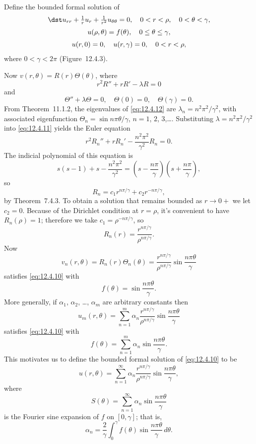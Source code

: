 \setcounter{example}{2}
\setcounter{equation}{9}
\begin{example}
  \label{example:12.4.3} \rm Define the bounded formal solution of
  \begin{equation}
    \label{eq:12.4.10}
    \begin{array}{c}
      \dst u_{rr}+\frac{1}{r}u_{r}+\frac{1}{r^{2}}u_{\theta\theta}=0,\quad 0<r<\rho,\quad0<\theta<\gamma, \\[2\jot]
      u(\rho,\theta)=f(\theta),\quad0\le\theta\le\gamma,                                                  \\[2\jot]
      u(r,0)=0,\quad u(r,\gamma)=0,\quad0<r<\rho,
    \end{array}
  \end{equation}
  where $0<\gamma<2\pi$ (Figure~12.4.3).
\end{example}
\setcounter{equation}{10}
\begin{examplesolution}
\solution Now $v(r,\theta)=R(r)\Theta(\theta)$, where
\begin{equation}
  \label{eq:12.4.11}r^{2}R''+rR'-\lambda R=0
\end{equation}
and
\begin{equation}
  \label{eq:12.4.12}\Theta''+\lambda\Theta=0,\quad\Theta(0)=0,\quad\Theta(\gamma)=0.
\end{equation}
From Theorem~11.1.2, the eigenvalues of \eqref{eq:12.4.12} are
$\lambda_{n}=n^{2}\pi^{2}/\gamma^{2}$, with associated eigenfunction
$\Theta_{n}=\sin n\pi\theta/\gamma$, $n=1$, $2$, $3$,\dots. Substituting
$\lambda=n^{2}\pi^{2}/\gamma^{2}$ into \eqref{eq:12.4.11} yields the Euler equation
\[
  r^{2}R_{n}''+rR_{n}'-\frac{n^{2}\pi^{2}}{\gamma^{2}}R_{n}=0.
\]
The indicial polynomial of this equation is
\[
  s(s-1)+s-\frac{n^{2}\pi^{2}}{\gamma^{2}}=\left(s-\frac{n\pi}{\gamma}\right) \left(s+\frac{n\pi}{\gamma}\right),
\]
so
\[
  R_{n}=c_{1}r^{n\pi/\gamma}+c_{2}r^{-n\pi/\gamma},
\]
by Theorem~7.4.3. To obtain a solution that remains bounded as $r\to0+$ we let
$c_{2}=0$. Because of the Dirichlet condition at $r=\rho$, it's convenient to have $R_{n}(\rho)=1$;
therefore we take $c_{1}=\rho^{-n\pi/\gamma}$, so
\[
  R_{n}(r)=\frac{r^{n\pi/\gamma}}{\rho^{n\pi/\gamma}}.
\]
Now
\[
  v_{n}(r,\theta)=R_{n}(r)\Theta_{n}(\theta)=\frac{r^{n\pi/\gamma}}{\rho^{n\pi/\gamma}}\sin\frac{n\pi\theta}{\gamma}
\]
satisfies \eqref{eq:12.4.10} with
\[
  f(\theta)=\sin\frac{n\pi\theta}{\gamma}.
\]
More generally, if $\alpha_{1}$, $\alpha_{2}$, \dots, $\alpha_{m}$ are arbitrary constants then
\[
  u_{m}(r,\theta)=\sum_{n=1}^{m}\alpha_{n}\frac{r^{n\pi/\gamma}}{\rho^{n\pi/\gamma}}\sin\frac{n\pi\theta}{\gamma}
\]
satisfies \eqref{eq:12.4.10} with
\[
  f(\theta) =\sum_{n=1}^{m}\alpha_{n}\sin\frac{n\pi\theta}{\gamma}.
\]
This motivates us to define the bounded formal solution of \eqref{eq:12.4.10} to be
\[
  u(r,\theta)=\sum_{n=1}^{\infty}\alpha_{n}\frac{r^{n\pi/\gamma}}{\rho^{n\pi/\gamma}}\sin\frac{n\pi\theta}{\gamma},
\]
where
\[
  S(\theta)=\sum_{n=1}^{\infty}\alpha_{n}\sin\frac{n\pi\theta}{\gamma}
\]
is the Fourier sine expansion of $f$ on $[0,\gamma]$; that is,
\[
  \alpha_{n}=\frac{2}{\gamma}\int_{0}^{\gamma}f(\theta)\sin\frac{n\pi\theta}{\gamma}\,d\theta.
\]
\end{examplesolution}

